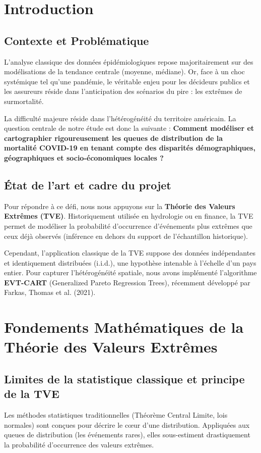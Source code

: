 \documentclass[11pt,a4paper]{article}
\begin{document}
\tableofcontents
\newpage

\section{Introduction}

\subsection{Contexte et Problématique}
L'analyse classique des données épidémiologiques repose majoritairement sur des modélisations de la tendance centrale (moyenne, médiane). Or, face à un choc systémique tel qu'une pandémie, le véritable enjeu pour les décideurs publics et les assureurs réside dans l'anticipation des scénarios du pire : les extrêmes de surmortalité. 

La difficulté majeure réside dans l'hétérogénéité du territoire américain. La question centrale de notre étude est donc la suivante : \textbf{Comment modéliser et cartographier rigoureusement les queues de distribution de la mortalité COVID-19 en tenant compte des disparités démographiques, géographiques et socio-économiques locales ?}

\subsection{État de l'art et cadre du projet}
Pour répondre à ce défi, nous nous appuyons sur la \textbf{Théorie des Valeurs Extrêmes (TVE)}. Historiquement utilisée en hydrologie ou en finance, la TVE permet de modéliser la probabilité d'occurrence d'événements plus extrêmes que ceux déjà observés (inférence en dehors du support de l'échantillon historique).

Cependant, l'application classique de la TVE suppose des données indépendantes et identiquement distribuées (i.i.d.), une hypothèse intenable à l'échelle d'un pays entier. Pour capturer l'hétérogénéité spatiale, nous avons implémenté l'algorithme \textbf{EVT-CART} (Generalized Pareto Regression Trees), récemment développé par Farkas, Thomas et al. (2021).

\section{Fondements Mathématiques de la Théorie des Valeurs Extrêmes}

\subsection{Limites de la statistique classique et principe de la TVE}
Les méthodes statistiques traditionnelles (Théorème Central Limite, lois normales) sont conçues pour décrire le cœur d'une distribution. Appliquées aux queues de distribution (les événements rares), elles sous-estiment drastiquement la probabilité d'occurrence des valeurs extrêmes. 
\end{document}

